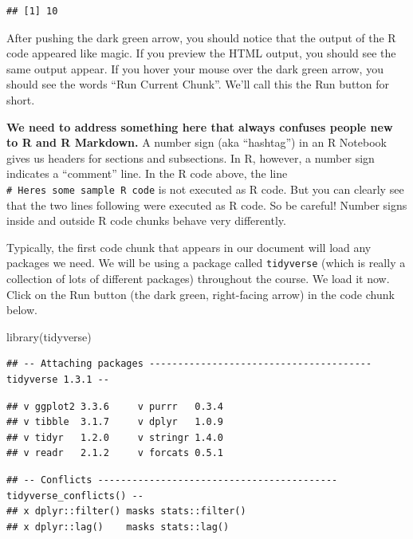 \documentclass[
]{book}
\newenvironment{Shaded}{\begin{snugshade}}{\end{snugshade}}
\newcommand{\FunctionTok}[1]{\textcolor[rgb]{0.00,0.00,0.00}{#1}}
\newcommand{\NormalTok}[1]{#1}
\begin{document}
\begin{verbatim}
## [1] 10
\end{verbatim}

After pushing the dark green arrow, you should notice that the output of the R code appeared like magic. If you preview the HTML output, you should see the same output appear. If you hover your mouse over the dark green arrow, you should see the words ``Run Current Chunk''. We'll call this the Run button for short.

\textbf{We need to address something here that always confuses people new to R and R Markdown.} A number sign (aka ``hashtag'') in an R Notebook gives us headers for sections and subsections. In R, however, a number sign indicates a ``comment'' line. In the R code above, the line \texttt{\#\ Here\textquotesingle{}s\ some\ sample\ R\ code} is not executed as R code. But you can clearly see that the two lines following were executed as R code. So be careful! Number signs inside and outside R code chunks behave very differently.

Typically, the first code chunk that appears in our document will load any packages we need. We will be using a package called \texttt{tidyverse} (which is really a collection of lots of different packages) throughout the course. We load it now. Click on the Run button (the dark green, right-facing arrow) in the code chunk below.

\begin{Shaded}
\begin{Highlighting}[]
\FunctionTok{library}\NormalTok{(tidyverse)}
\end{Highlighting}
\end{Shaded}

\begin{verbatim}
## -- Attaching packages --------------------------------------- tidyverse 1.3.1 --
\end{verbatim}

\begin{verbatim}
## v ggplot2 3.3.6     v purrr   0.3.4
## v tibble  3.1.7     v dplyr   1.0.9
## v tidyr   1.2.0     v stringr 1.4.0
## v readr   2.1.2     v forcats 0.5.1
\end{verbatim}

\begin{verbatim}
## -- Conflicts ------------------------------------------ tidyverse_conflicts() --
## x dplyr::filter() masks stats::filter()
## x dplyr::lag()    masks stats::lag()
\end{verbatim}
\end{document}
